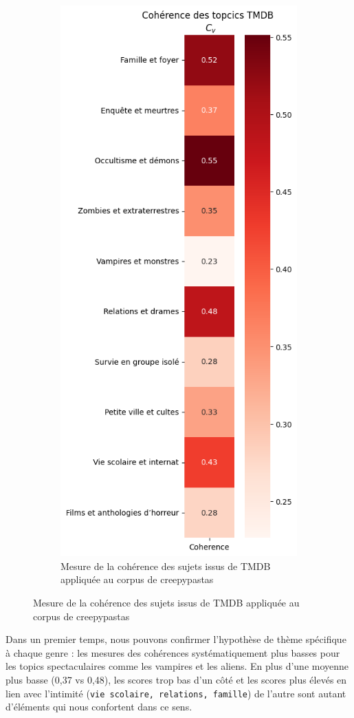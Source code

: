 \documentclass[12pt,a4paper,oneside,titlepage]{book} %
\begin{document}
\begin{figure}[htbp]
\begin{subfigure}[b]{0.45\textwidth}
    \includegraphics[width=0.5\linewidth]{illustration/coherence_tmdb.png}
    \caption{Mesure de la cohérence des sujets issus de TMDB appliquée au corpus de creepypastas}
    \label{fig:coherence_tmdb}
\end{subfigure}
\end{figure}

Dans un premier temps, nous pouvons confirmer l'hypothèse de thème spécifique à chaque genre : les mesures des cohérences systématiquement plus basses pour les topics spectaculaires comme les vampires et les aliens. En plus d'une moyenne plus basse (0,37 vs 0,48), les scores trop bas d'un côté et les scores plus élevés en lien avec l'intimité (\texttt{vie scolaire, relations, famille}) de l'autre sont autant d'éléments qui nous confortent dans ce sens. 
\end{document}
